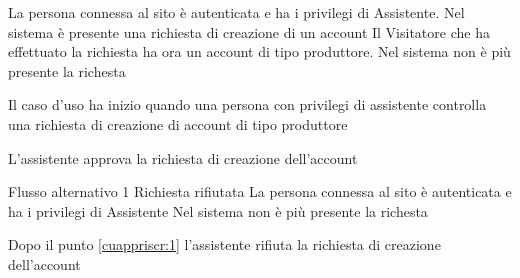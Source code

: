 {}
{La persona connessa al sito è autenticata e ha i privilegi di  Assistente. Nel sistema è presente una richiesta di creazione di un account}
{Il Visitatore che ha effettuato la richiesta ha ora un account di tipo produttore. Nel sistema non è più presente la richesta}
{\begin{enumCU}
	\item Il caso d'uso ha inizio quando una persona con privilegi di assistente controlla una richiesta di creazione di account di tipo produttore \label{cuappriscr:1}
	\item L'assistente approva la richiesta di creazione dell'account
\end{enumCU}}
%
{Flusso alternativo 1}%
{Richiesta rifiutata}%
{La persona connessa al sito è autenticata e ha i privilegi di Assistente}%
{Nel sistema non è più presente la richesta}%
{\begin{enumCU}
		\item Dopo il punto \ref{cuappriscr:1} l'assistente rifiuta la richiesta di creazione dell'account
	\end{enumCU}}%

